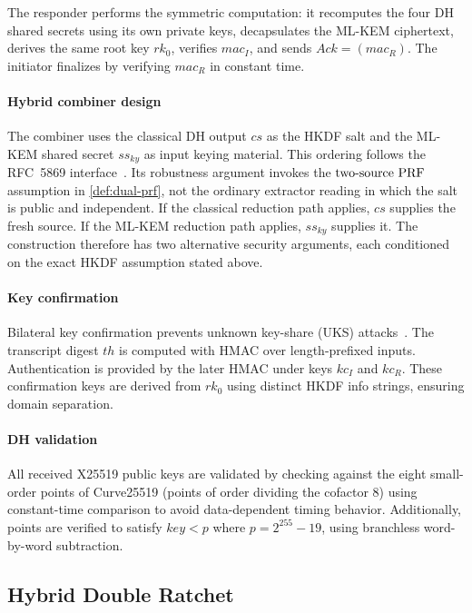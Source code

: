 \documentclass[preprint,12pt]{elsarticle}
\theoremstyle{definition}
\newcommand{\tech}[1]{\textnormal{#1}}
\newcommand{\twoSourcePRF}{\tech{two-source PRF}}
\newcommand{\rk}{\mathit{rk}}
\begin{document}
The responder performs the symmetric computation: it recomputes the four DH shared secrets using its own private keys, decapsulates the ML-KEM ciphertext, derives the same root key $\rk_0$, verifies $\mathit{mac}_I$, and sends $\mathit{Ack} = (\mathit{mac}_R)$. The initiator finalizes by verifying $\mathit{mac}_R$ in constant time.

\paragraph{Hybrid combiner design}
The combiner uses the classical DH output $\mathit{cs}$ as the HKDF salt and the ML-KEM shared secret $\mathit{ss}_{\mathit{ky}}$ as input keying material. This ordering follows the RFC~5869 interface~\cite{rfc5869}. Its robustness argument invokes the $\twoSourcePRF$ assumption in \cref{def:dual-prf}, not the ordinary extractor reading in which the salt is public and independent. If the classical reduction path applies, $\mathit{cs}$ supplies the fresh source. If the ML-KEM reduction path applies, $\mathit{ss}_{\mathit{ky}}$ supplies it. The construction therefore has two alternative security arguments, each conditioned on the exact HKDF assumption stated above.

\paragraph{Key confirmation}
Bilateral key confirmation prevents unknown key-share (UKS) attacks~\cite{lamacchia2007}. The transcript digest $\mathit{th}$ is computed with HMAC over length-prefixed inputs. Authentication is provided by the later HMAC under keys $\mathit{kc}_I$ and $\mathit{kc}_R$. These confirmation keys are derived from $\rk_0$ using distinct HKDF info strings, ensuring domain separation.

\paragraph{DH validation}
All received X25519 public keys are validated by checking against the eight small-order points of Curve25519 (points of order dividing the cofactor 8) using constant-time comparison to avoid data-dependent timing behavior. Additionally, points are verified to satisfy $\mathit{key} < p$ where $p = 2^{255} - 19$, using branchless word-by-word subtraction.

\subsection{Hybrid Double Ratchet}\label{sec:ratchet}
\end{document}
